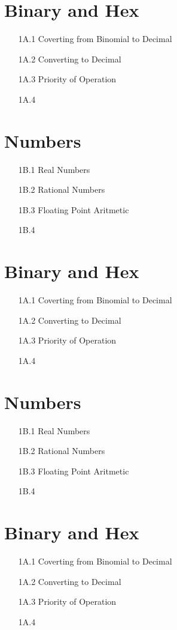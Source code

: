 \documentclass{article}
\begin{document}
\section*{Binary and Hex}
\begin{itemize}
\item[1A.1] Coverting from Binomial to Decimal
\item[1A.2] Converting to Decimal
\item[1A.3] Priority of Operation
\item[1A.4] 
\end{itemize}
\newpage
\section*{Numbers}
\begin{itemize}
\item[1B.1] Real Numbers
\item[1B.2] Rational Numbers
\item[1B.3] Floating Point Aritmetic
\item[1B.4] 
\end{itemize}
\section*{Binary and Hex}
\begin{itemize}
\item[1A.1] Coverting from Binomial to Decimal
\item[1A.2] Converting to Decimal
\item[1A.3] Priority of Operation
\item[1A.4] 
\end{itemize}

\section*{Numbers}
\begin{itemize}
\item[1B.1] Real Numbers
\item[1B.2] Rational Numbers
\item[1B.3] Floating Point Aritmetic
\item[1B.4] 
\end{itemize}
\section*{Binary and Hex}
\begin{itemize}
\item[1A.1] Coverting from Binomial to Decimal
\item[1A.2] Converting to Decimal
\item[1A.3] Priority of Operation
\item[1A.4] 
\end{itemize}
\end{document}
